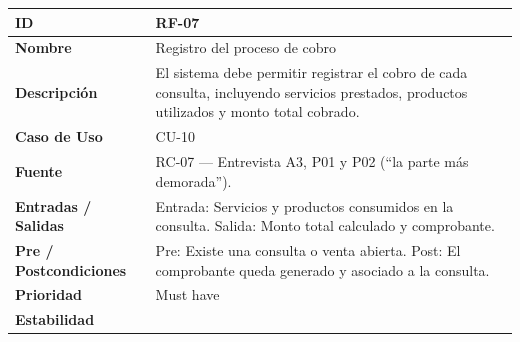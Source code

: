\documentclass[
]{article}
\newcounter{none} %
\begin{document}
{\def\LTcaptype{none} %
\begin{longtable}[]{|
  >{\raggedright\arraybackslash}p{}|
  >{\raggedright\arraybackslash}p{}|}
\hline
\begin{minipage}[b]{\linewidth}\raggedright
\textbf{ID}
\end{minipage} & \begin{minipage}[b]{\linewidth}\raggedright
RF-07
\end{minipage} \\
\hline
\endhead
\hline
\endlastfoot
\textbf{Nombre} & \begin{minipage}[t]{\linewidth}\raggedright
Registro del proceso de cobro
\end{minipage} \\
\hline
\textbf{Descripción} & \begin{minipage}[t]{\linewidth}\raggedright
El sistema debe permitir registrar el cobro de cada consulta, incluyendo servicios prestados, productos utilizados y monto total cobrado.
\end{minipage} \\
\hline
\textbf{Caso de Uso} & \begin{minipage}[t]{\linewidth}\raggedright
CU-10
\end{minipage} \\
\hline
\textbf{Fuente} & \begin{minipage}[t]{\linewidth}\raggedright
RC-07 — Entrevista A3, P01 y P02 (“la parte más demorada”).
\end{minipage} \\
\hline
\textbf{Entradas / Salidas} & \begin{minipage}[t]{\linewidth}\raggedright
Entrada: Servicios y productos consumidos en la consulta. Salida: Monto total calculado y comprobante.
\end{minipage} \\
\hline
\textbf{Pre / Postcondiciones} & \begin{minipage}[t]{\linewidth}\raggedright
Pre: Existe una consulta o venta abierta. Post: El comprobante queda generado y asociado a la consulta.
\end{minipage} \\
\hline
\textbf{Prioridad} & \begin{minipage}[t]{\linewidth}\raggedright
Must have
\end{minipage} \\
\hline
\textbf{Estabilidad} & \begin{minipage}[t]{\linewidth}\raggedright

\end{minipage}
\end{longtable}}
\end{document}
